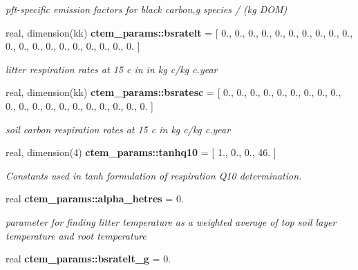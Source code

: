 \begin{DoxyCompactItemize}
\begin{DoxyCompactList}\small\item\em pft-\/specific emission factors for black carbon,g species / (kg D\+O\+M) \end{DoxyCompactList}\item 
\hypertarget{namespacectem__params_a9ba355c48c189d4bbe0db06896779c1f}{}real, dimension(kk) {\bfseries ctem\+\_\+params\+::bsratelt} = \mbox{[} 0., 0., 0., 0., 0., 0., 0., 0., 0., 0., 0., 0., 0., 0., 0., 0., 0., 0., 0., 0. \mbox{]}\label{namespacectem__params_a9ba355c48c189d4bbe0db06896779c1f}

\begin{DoxyCompactList}\small\item\em litter respiration rates at 15 c in in kg c/kg c.\+year \end{DoxyCompactList}\item 
\hypertarget{namespacectem__params_a25b64781ac846ded3ac9024e4b4074bb}{}real, dimension(kk) {\bfseries ctem\+\_\+params\+::bsratesc} = \mbox{[} 0., 0., 0., 0., 0., 0., 0., 0., 0., 0., 0., 0., 0., 0., 0., 0., 0., 0., 0., 0. \mbox{]}\label{namespacectem__params_a25b64781ac846ded3ac9024e4b4074bb}

\begin{DoxyCompactList}\small\item\em soil carbon respiration rates at 15 c in kg c/kg c.\+year \end{DoxyCompactList}\item 
\hypertarget{namespacectem__params_a04f581d88bb99a2d4d4128f684a46ba6}{}real, dimension(4) {\bfseries ctem\+\_\+params\+::tanhq10} = \mbox{[} 1., 0., 0., 46. \mbox{]}\label{namespacectem__params_a04f581d88bb99a2d4d4128f684a46ba6}

\begin{DoxyCompactList}\small\item\em Constants used in tanh formulation of respiration Q10 determination. \end{DoxyCompactList}\item 
\hypertarget{namespacectem__params_a403de9621ddedbe9dcc984bb874e8298}{}real {\bfseries ctem\+\_\+params\+::alpha\+\_\+hetres} = 0.\label{namespacectem__params_a403de9621ddedbe9dcc984bb874e8298}

\begin{DoxyCompactList}\small\item\em parameter for finding litter temperature as a weighted average of top soil layer temperature and root temperature \end{DoxyCompactList}\item 
\hypertarget{namespacectem__params_af429d00148e673d58d18e9d3a419ee66}{}real {\bfseries ctem\+\_\+params\+::bsratelt\+\_\+g} = 0.\label{namespacectem__params_af429d00148e673d58d18e9d3a419ee66}


\end{DoxyCompactItemize}
